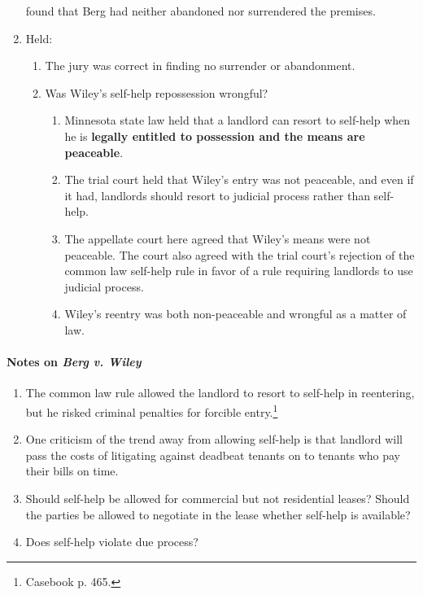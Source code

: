 \begin{enumerate}
    found that Berg had neither abandoned nor surrendered the premises.
    \item Held:
    \begin{enumerate}
        \item The jury was correct in finding no surrender or abandonment.
        \item Was Wiley's self-help repossession wrongful?
        \begin{enumerate}
            \item Minnesota state law held that a landlord can resort to 
            self-help when he is \textbf{legally entitled to possession and 
            the means are peaceable}.
            \item The trial court held that Wiley's entry was not peaceable, 
            and even if it had, landlords should resort to judicial process 
            rather than self-help.
            \item The appellate court here agreed that Wiley's means were not 
            peaceable. The court also agreed with the trial court's rejection 
            of the common law self-help rule in favor of a rule requiring 
            landlords to use judicial process.
            \item Wiley's reentry was both non-peaceable and wrongful as a 
            matter of law.
        \end{enumerate}
    \end{enumerate}
\end{enumerate}

\paragraph{Notes on \emph{Berg v. Wiley}}

\begin{enumerate}
    \item The common law rule allowed the landlord to resort to self-help in 
    reentering, but he risked criminal penalties for forcible 
    entry.\footnote{Casebook p. 465.}
    \item One criticism of the trend away from allowing self-help is that 
    landlord will pass the costs of litigating against deadbeat tenants on to 
    tenants who pay their bills on time.
    \item Should self-help be allowed for commercial but not residential 
    leases? Should the parties be allowed to negotiate in the lease whether 
    self-help is available?
    \item Does self-help violate due process?
\end{enumerate}

